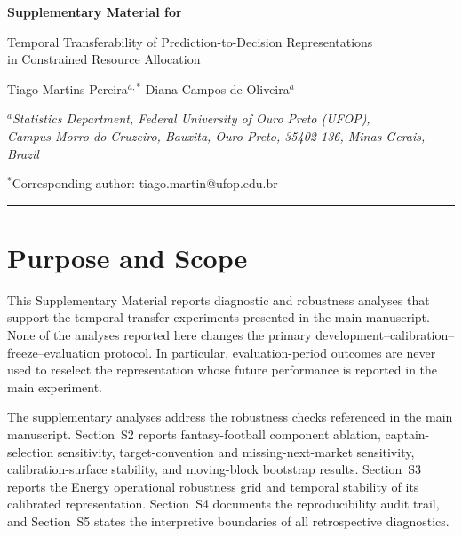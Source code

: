 \documentclass[a4paper,fleqn]{cas-sc}
\begin{document}

\suppressfloats[t]

\begin{center}
{\LARGE\bfseries Supplementary Material for\par}
\vspace{0.35em}
{\Large Temporal Transferability of Prediction-to-Decision Representations\\
in Constrained Resource Allocation\par}
\vspace{1.1em}
{\normalsize Tiago Martins Pereira$^{a,*}$ \quad Diana Campos de Oliveira$^{a}$\par}
\vspace{0.55em}
{\small\itshape
$^{a}$Statistics Department, Federal University of Ouro Preto (UFOP),\\
Campus Morro do Cruzeiro, Bauxita, Ouro Preto, 35402-136, Minas Gerais, Brazil\par}
\vspace{0.35em}
{\small $^{*}$Corresponding author: tiago.martin@ufop.edu.br\par}
\end{center}

\vspace{1.0em}
\hrule
\vspace{1.2em}

\section{Purpose and Scope}
\label{sec:supp_scope}

This Supplementary Material reports diagnostic and robustness analyses that
support the temporal transfer experiments presented in the main manuscript.
None of the analyses reported here changes the primary
development--calibration--freeze--evaluation protocol. In particular,
evaluation-period outcomes are never used to reselect the representation whose
future performance is reported in the main experiment.

The supplementary analyses address the robustness checks referenced in the
main manuscript. Section~S2 reports fantasy-football component ablation,
captain-selection sensitivity, target-convention and missing-next-market
sensitivity, calibration-surface stability, and moving-block bootstrap results.
Section~S3 reports the Energy operational robustness grid and temporal stability
of its calibrated representation. Section~S4 documents the reproducibility
audit trail, and Section~S5 states the interpretive boundaries of all
retrospective diagnostics.
\end{document}
